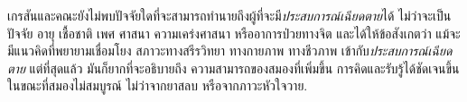 {\begin{shaded}
		
		
		
		
		เกรสันและคณะยังไม่พบปัจจัยใดที่จะสามารถทำนายถึงผู้ที่จะมี\textit{ประสบการณ์เฉียดตาย}ได้ ไม่ว่าจะเป็นปัจจัย อายุ เชื้อชาติ เพศ ศาสนา ความเคร่งศาสนา หรืออาการป่วยทางจิต
		และได้ให้ข้อสังเกตว่า แม้จะมีแนวคิดที่พยายามเชื่อมโยง สภาวะทางสรีรวิทยา ทางกายภาพ ทางชีวภาพ เข้ากับ\textit{ประสบการณ์เฉียดตาย}
		แต่ที่สุดแล้ว 
		มันก็ยากที่จะอธิบายถึง ความสามารถของสมองที่เพิ่มขึ้น การคิดและรับรู้ได้ชัดเจนขึ้น ในขณะที่สมองไม่สมบูรณ์ ไม่ว่าจากยาสลบ หรือจากภาวะหัวใจวาย.
		
		
		
		

\end{shaded}}
